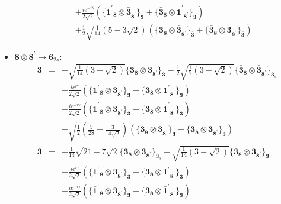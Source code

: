 \documentclass[english]{article}
\newcommand{\subcg}[3]{\big\{ {#1}\otimes{#2}\big\}^{}_{#3}}
\newcommand{\rep}[1]{\mathbf{#1}}
\begin{document}
\begin{itemize}
\begin{eqnarray*}
 & & +\frac{i e^{-i \delta }}{2 \sqrt{2}}\left(\subcg{\rep{\bar{1}^{\prime}}_{\rep{8}}}{\rep{\bar{3}}_{\rep{8^{\prime}}}}{\rep{\bar{3}}}+\subcg{\rep{\bar{3}}_{\rep{8}}}{\rep{\bar{1}^{\prime}}_{\rep{8^{\prime}}}}{\rep{\bar{3}}}\right) \\ 
 & & +\frac{1}{2} \sqrt{\frac{1}{14} \left(5-3 \sqrt{2}\right)}\left(\subcg{\rep{3}_{\rep{8}}}{\rep{\bar{3}}_{\rep{8^{\prime}}}}{\rep{\bar{3}}}+\subcg{\rep{\bar{3}}_{\rep{8}}}{\rep{3}_{\rep{8^{\prime}}}}{\rep{\bar{3}}}\right)
\end{eqnarray*}
\item $\rep{8}\otimes\rep{8^{\prime}}\to\rep{6}_{2s}$:
\begin{eqnarray*}
\rep{3} &=& -\sqrt{\frac{1}{14} \left(3-\sqrt{2}\right)}\subcg{\rep{3}_{\rep{8}}}{\rep{3}_{\rep{8^{\prime}}}}{\rep{3}}-\frac{1}{2} \sqrt{\frac{1}{7} \left(3-\sqrt{2}\right)}\subcg{\rep{\bar{3}}_{\rep{8}}}{\rep{\bar{3}}_{\rep{8^{\prime}}}}{\rep{3}_{s}} \\ 
 & & -\frac{i e^{i \gamma }}{2 \sqrt{2}}\left(\subcg{\rep{1^{\prime}}_{\rep{8}}}{\rep{3}_{\rep{8^{\prime}}}}{\rep{3}}+\subcg{\rep{3}_{\rep{8}}}{\rep{1^{\prime}}_{\rep{8^{\prime}}}}{\rep{3}}\right) \\ 
 & & +\frac{i e^{-i \gamma }}{2 \sqrt{2}}\left(\subcg{\rep{\bar{1}^{\prime}}_{\rep{8}}}{\rep{3}_{\rep{8^{\prime}}}}{\rep{3}}+\subcg{\rep{3}_{\rep{8}}}{\rep{\bar{1}^{\prime}}_{\rep{8^{\prime}}}}{\rep{3}}\right) \\ 
 & & +\sqrt{\frac{1}{2} \left(\frac{5}{28}+\frac{3}{14 \sqrt{2}}\right)}\left(\subcg{\rep{3}_{\rep{8}}}{\rep{\bar{3}}_{\rep{8^{\prime}}}}{\rep{3}}+\subcg{\rep{\bar{3}}_{\rep{8}}}{\rep{3}_{\rep{8^{\prime}}}}{\rep{3}}\right)
\\
\rep{\bar{3}} &=& -\frac{1}{14} \sqrt{21-7 \sqrt{2}}\subcg{\rep{3}_{\rep{8}}}{\rep{3}_{\rep{8^{\prime}}}}{\rep{\bar{3}}_{s}}-\sqrt{\frac{1}{14} \left(3-\sqrt{2}\right)}\subcg{\rep{\bar{3}}_{\rep{8}}}{\rep{\bar{3}}_{\rep{8^{\prime}}}}{\rep{\bar{3}}} \\ 
 & & -\frac{i e^{i \gamma }}{2 \sqrt{2}}\left(\subcg{\rep{1^{\prime}}_{\rep{8}}}{\rep{\bar{3}}_{\rep{8^{\prime}}}}{\rep{\bar{3}}}+\subcg{\rep{\bar{3}}_{\rep{8}}}{\rep{1^{\prime}}_{\rep{8^{\prime}}}}{\rep{\bar{3}}}\right) \\ 
 & & +\frac{i e^{-i \gamma }}{2 \sqrt{2}}\left(\subcg{\rep{\bar{1}^{\prime}}_{\rep{8}}}{\rep{\bar{3}}_{\rep{8^{\prime}}}}{\rep{\bar{3}}}+\subcg{\rep{\bar{3}}_{\rep{8}}}{\rep{\bar{1}^{\prime}}_{\rep{8^{\prime}}}}{\rep{\bar{3}}}\right) \\ 

\end{eqnarray*}
\end{itemize}
\end{document}
